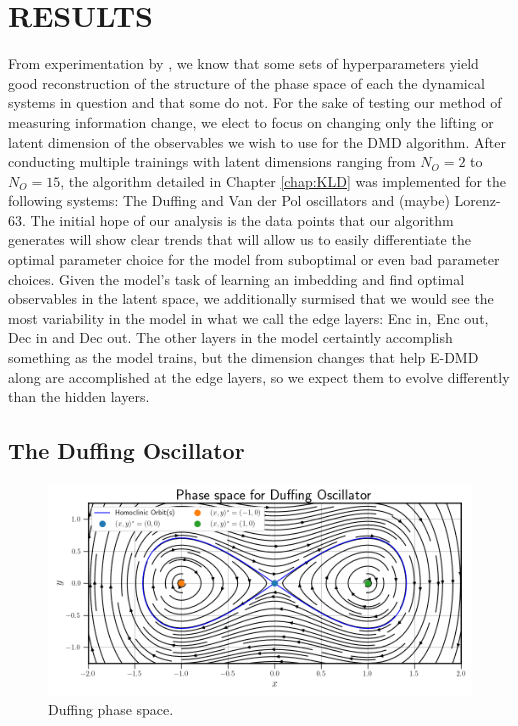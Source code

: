 \chapter{RESULTS}
\label{chap:results}
From experimentation by \cite{lago}, we know that some sets of hyperparameters yield good reconstruction
of the structure of the phase space of each the dynamical systems in question and that some do not. For
the sake of testing our method of measuring information change, we elect to focus on changing only the 
lifting or latent dimension of the observables we wish to use for the DMD algorithm. After conducting 
multiple trainings with latent dimensions ranging from $N_O = 2$ to $N_O = 15$, the algorithm detailed 
in Chapter \ref{chap:KLD} was implemented for the following systems: The Duffing and Van der Pol oscillators
and (maybe) Lorenz-63. The initial hope of our analysis is the data points that our algorithm generates 
will show clear trends that will allow us to easily differentiate the optimal parameter choice for the 
model from suboptimal or even bad parameter choices. Given the model's task of learning an imbedding and 
find optimal observables in the latent space, we additionally surmised that we would see the most 
variability in the model in what we call the edge layers: Enc in, Enc out, Dec in and Dec out. The 
other layers in the model certaintly accomplish something as the model trains, but the dimension changes 
that help E-DMD along are accomplished at the edge layers, so we expect them to evolve differently than
the hidden layers.

\section{The Duffing Oscillator}
\label{section:duffing results}

\begin{figure}[ht]
    \centering
    \begin{minipage}{\textwidth}
        \includegraphics[width=\textwidth]{"Figures/duffing_phase_space.png"}
    \end{minipage}
    \caption{Duffing phase space.}
    \label{fig:duffing phase space}
\end{figure}

